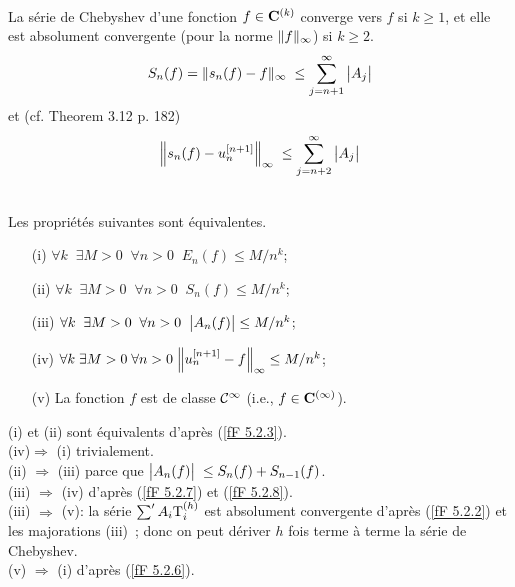 \smallskip{} 
\\
La série de Chebyshev d'une fonction  $f \in {\bf C}^{(k)}$  converge \uni  vers 
$f$ si  $k \geq 1$,   et elle est absolument convergente (pour la norme  
$\lVert  f  \rVert_{\infty}$)  si  $k \geq 2$.   
\begin{equation} \label{fF 5.2.7}
S_n(f) = \lVert  s_n(f)-f  \rVert_{\infty}\; \leq \sum_{j=n+1}^{\infty} 
\big|{A_j}\big|
\end{equation}
et (cf. \cite{fRi} Theorem 3.12 p. 182)
\begin{equation} \label{fF 5.2.8}
\Big\lVert  s_n(f)- u_n^{[n+1]}  \Big\rVert_{\infty}\; \leq \sum_{j=n+2}^{\infty} 
\big|{A_j}\big|
\end{equation}

\smallskip{} \\
Les propriétés suivantes sont équivalentes. 
\begin{itemize}\itemsep2pt
\item [(i)]  $\forall k \; \; \exists M > 0 \; \; \forall n> 0 \; \; E_n(f) \leq M/n^k$; 
\item [(ii)]
 $\forall k \; \; \exists M > 0 \; \; \forall n> 0 \; \; S_n(f) \leq M/n^k$;
\item [(iii)] 
$\forall k \; \; \exists M > 0 \; \; \forall n> 0 \; \; \big|{A_n(f)}\big|  \leq 
M/n^k$;
\item [(iv)] $\forall k \; \exists M > 0 \; \forall n> 0 \; \Big\lVert  u_n^{[n+1]} - f  \Big\rVert_{\infty} \leq M/n^k$;
\item [(v)] 
La fonction  $f$ est de classe ${{\cal C}}^{\infty}$ (i.e., $f \in {\bf C}^{(\infty)}$).
\end{itemize}

\proof 
(i)  et  (ii)  sont équivalents d'après  (\ref{fF 5.2.3}). \\   
(iv)$\Rightarrow$ (i)  trivialement.  \\  
(ii) $\Rightarrow$ (iii)  parce que  $\big|{A_n(f)}\big|\;  \leq S_n(f) + S_{n-
1}(f)$.  \\
(iii) $\Rightarrow$ (iv)  d'après  (\ref{fF 5.2.7})  et  (\ref{fF 5.2.8}).  \\  
(iii) $\Rightarrow$ (v): la série  $\sum' A_i{\rm T}_i^{(h)}$  est  absolument 
convergente d'après  (\ref{fF 5.2.2})  et les majorations  (iii)~;  donc on 
peut dériver $h$ fois terme à terme la série de Chebyshev.    \\ 
(v) $\Rightarrow$ (i)  d'après  (\ref{fF 5.2.6}).  \eop


